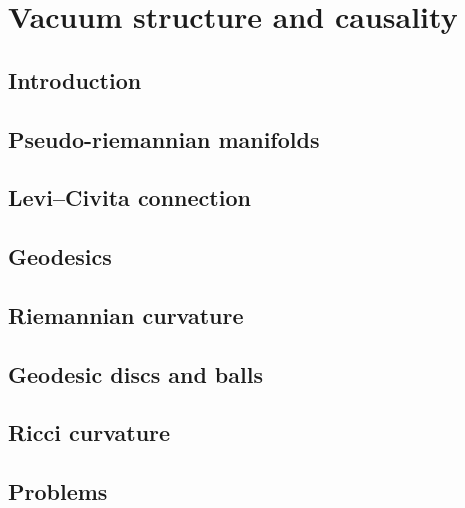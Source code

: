 \chapter{Vacuum structure and causality}

\section{Introduction}

\section{Pseudo-riemannian manifolds}

\section{Levi--Civita connection}

\section{Geodesics}

\section{Riemannian curvature}

\section{Geodesic discs and balls}

\section{Ricci curvature}

\section{Problems}
